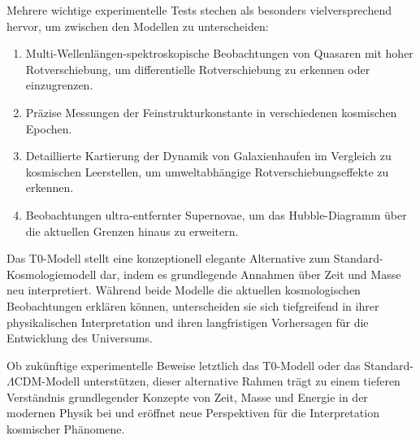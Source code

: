 \documentclass[a4paper,12pt]{article}
\theoremstyle{definition}
\theoremstyle{remark}
\begin{document}
	Mehrere wichtige experimentelle Tests stechen als besonders vielversprechend hervor, um zwischen den Modellen zu unterscheiden:
	
	\begin{enumerate}
		\item Multi-Wellenlängen-spektroskopische Beobachtungen von Quasaren mit hoher Rotverschiebung, um differentielle Rotverschiebung zu erkennen oder einzugrenzen.
		\item Präzise Messungen der Feinstrukturkonstante in verschiedenen kosmischen Epochen.
		\item Detaillierte Kartierung der Dynamik von Galaxienhaufen im Vergleich zu kosmischen Leerstellen, um umweltabhängige Rotverschiebungseffekte zu erkennen.
		\item Beobachtungen ultra-entfernter Supernovae, um das Hubble-Diagramm über die aktuellen Grenzen hinaus zu erweitern.
	\end{enumerate}
	
	Das T0-Modell stellt eine konzeptionell elegante Alternative zum Standard-Kosmologiemodell dar, indem es grundlegende Annahmen über Zeit und Masse neu interpretiert. Während beide Modelle die aktuellen kosmologischen Beobachtungen erklären können, unterscheiden sie sich tiefgreifend in ihrer physikalischen Interpretation und ihren langfristigen Vorhersagen für die Entwicklung des Universums.
	
	Ob zukünftige experimentelle Beweise letztlich das T0-Modell oder das Standard-$\Lambda$CDM-Modell unterstützen, dieser alternative Rahmen trägt zu einem tieferen Verständnis grundlegender Konzepte von Zeit, Masse und Energie in der modernen Physik bei und eröffnet neue Perspektiven für die Interpretation kosmischer Phänomene.
	
\end{document}
